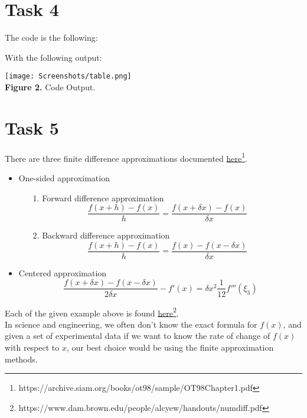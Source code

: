 \documentclass{article}
\begin{document}
\section{Task 4}
The code is the following:

With the following output:
\begin{center}
\texttt{[image: Screenshots/table.png]}\\
{\bf Figure 2.} Code Output.
\end{center}

\vspace{5pt}

\section{Task 5}
There are three finite difference approximations documented \href{https://archive.siam.org/books/ot98/sample/OT98Chapter1.pdf}{here}\footnote{https://archive.siam.org/books/ot98/sample/OT98Chapter1.pdf}.
\begin{itemize}
\item One-sided approximation 
	\begin{enumerate}
	\item[1. ] Forward difference approximation 
		$$\dfrac{f(x+h) - f(x)}{h} = \dfrac{f(x + \delta x) - f(x)}{\delta x}$$
	\item[2. ] Backward difference approximation 
		$$\dfrac{f(x+h) - f(x)}{h} = \dfrac{f(x) - f(x - \delta x)}{\delta x}$$
	\end{enumerate}
\item Centered approximation
	$$\dfrac{f(x + \delta x) - f(x - \delta x)}{2\delta x} - f'(x) = \delta x^2 \dfrac{1}{12} f'''(\xi_3)$$
\end{itemize}
Each of the given example above is found \href{https://www.dam.brown.edu/people/alcyew/handouts/numdiff.pdf}{here}\footnote{https://www.dam.brown.edu/people/alcyew/handouts/numdiff.pdf}.\\
In science and engineering, we often don't know the exact formula for $f(x)$, and given a set of experimental data if we want to know the rate of change of $f(x)$ with respect to $x$, our best choice would be using the finite approximation methods.
\end{document}
